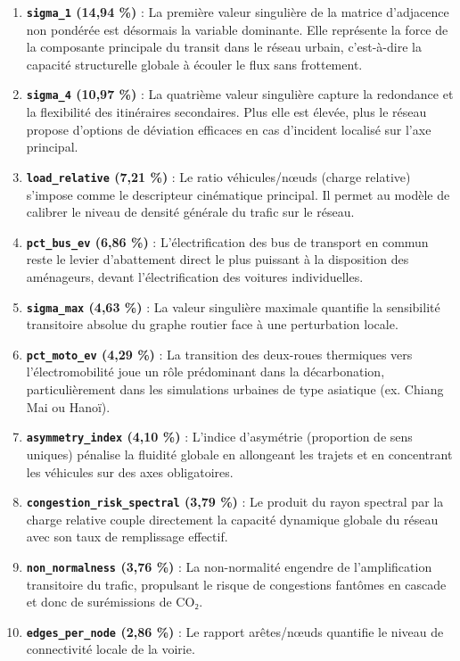 \documentclass[10pt, a4paper]{article}
\providecommand{\tightlist}{}
\begin{document}
\begin{enumerate}
\def\labelenumi{\arabic{enumi}.}
\tightlist
\item
  \textbf{\texttt{sigma\_1} (14,94 \%)} : La première valeur singulière
  de la matrice d'adjacence non pondérée est désormais la variable
  dominante. Elle représente la force de la composante principale du
  transit dans le réseau urbain, c'est-à-dire la capacité structurelle
  globale à écouler le flux sans frottement.
\item
  \textbf{\texttt{sigma\_4} (10,97 \%)} : La quatrième valeur singulière
  capture la redondance et la flexibilité des itinéraires secondaires.
  Plus elle est élevée, plus le réseau propose d'options de déviation
  efficaces en cas d'incident localisé sur l'axe principal.
\item
  \textbf{\texttt{load\_relative} (7,21 \%)} : Le ratio véhicules/nœuds
  (charge relative) s'impose comme le descripteur cinématique principal.
  Il permet au modèle de calibrer le niveau de densité générale du
  trafic sur le réseau.
\item
  \textbf{\texttt{pct\_bus\_ev} (6,86 \%)} : L'électrification des bus
  de transport en commun reste le levier d'abattement direct le plus
  puissant à la disposition des aménageurs, devant l'électrification des
  voitures individuelles.
\item
  \textbf{\texttt{sigma\_max} (4,63 \%)} : La valeur singulière maximale
  quantifie la sensibilité transitoire absolue du graphe routier face à
  une perturbation locale.
\item
  \textbf{\texttt{pct\_moto\_ev} (4,29 \%)} : La transition des
  deux-roues thermiques vers l'électromobilité joue un rôle prédominant
  dans la décarbonation, particulièrement dans les simulations urbaines
  de type asiatique (ex. Chiang Mai ou Hanoï).
\item
  \textbf{\texttt{asymmetry\_index} (4,10 \%)} : L'indice d'asymétrie
  (proportion de sens uniques) pénalise la fluidité globale en
  allongeant les trajets et en concentrant les véhicules sur des axes
  obligatoires.
\item
  \textbf{\texttt{congestion\_risk\_spectral} (3,79 \%)} : Le produit du
  rayon spectral par la charge relative couple directement la capacité
  dynamique globale du réseau avec son taux de remplissage effectif.
\item
  \textbf{\texttt{non\_normalness} (3,76 \%)} : La non-normalité
  engendre de l'amplification transitoire du trafic, propulsant le
  risque de congestions fantômes en cascade et donc de surémissions de
  CO₂.
\item
  \textbf{\texttt{edges\_per\_node} (2,86 \%)} : Le rapport arêtes/nœuds
  quantifie le niveau de connectivité locale de la voirie.
\end{enumerate}
\end{document}
